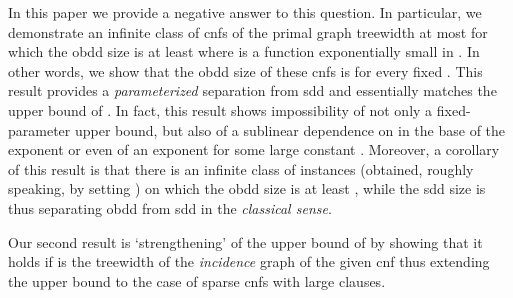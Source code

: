 \documentclass{article}
\begin{document}
In this paper we provide a negative answer to this question. In particular, we demonstrate an infinite class of
{\sc cnf}s of the primal graph treewidth at most  for which the {\sc obdd} size is at least
 where  is a function exponentially small in . In other words, we show
that the {\sc obdd} size of these {\sc cnf}s is  for every fixed .
This result provides a \emph{parameterized} separation from {\sc sdd} and essentially matches the upper bound of \cite{VardiTWD}. 
In fact, this result shows impossibility of not only a fixed-parameter upper bound, but also 
of a sublinear dependence on  in the base of the exponent or even of 
an exponent  for some large constant . Moreover, a corollary of this result is that there is
an infinite class of instances (obtained, roughly speaking, by setting ) on which the {\sc obdd} 
size is at least , while the {\sc sdd} size is  thus separating {\sc obdd} 
from {\sc sdd} in the \emph{classical sense}.


Our second result is `strengthening' of the upper bound  of \cite{VardiTWD} by showing that it
holds if  is the treewidth of the \emph{incidence} graph of the given {\sc cnf} thus extending the 
upper bound to the case of sparse {\sc cnf}s with large clauses. 

\begin{comment}
Taking into account that  lower bound presented in this paper applies when  is 
the treewidth of the incidence
graph (the treewidth of the incidence graph is at most the treewidth of the primal graph plus one),
we conclude that, together with the upper bound of \cite{VardiTWD},
the results of this paper provide a \emph{complete classification} of the expressive power of {\sc obdd} for
{\sc cnf}s parameterized by the treewidth of their primal and incidence graphs. 
\end{comment}

\begin{comment}
In \cite{VardiTWD}, Ferrara, Pan, and Vardi showed that for any {\sc cnf} with 
variables and treewidth  of the primal graph can be compiled into an Ordered Binary 
Decision Diagram ({\sc obdd}) of size
. A natural question is whether there is a Fixed-Parameter upper bound on the
size of the {\sc obdd}, i.e. the one represented in the form  where 
is some exponential (or even superexponential) function and  is a constant independent
on . In this paper we prove that this is impossible. In particular, we show 
that for each  there is a function 
and an infinite class of {\sc cnf}s with treewidth at most  of the 
primal graph such that for each element  of this class the size of the smallest
possible {\sc obdd} computing  is at least .
This result shows impossibility of not only a fixed-parameter upper bound, but also 
of a sublinear dependence on  in the base of the exponent or even of 
an exponent  for some large constant . On the positive side, we show that 
the  upper bound holds for the case where  is the treewidth of the 
incidence graph of the given {\sc cnf}. To the best of our knowledge the lower bound reported 
in this paper is the first one ruling out the possibility of fixed-parameter size 
{\sc obdd}s for {\sc cnf}s with a fixed treewidth. 
\end{comment}
\end{document}
